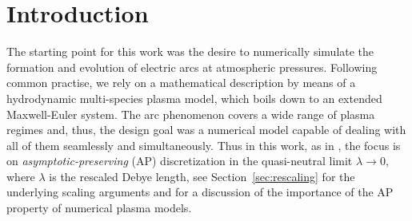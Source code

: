 \documentclass{article}
\newcommand{\mycomment}[1]{\noindent\textcolor{orange}{\underline{\textsf{\textbf{#1}}}}}
\begin{document}



\section{Introduction}

The starting point for this work was the desire to numerically simulate the formation and
evolution of electric arcs at atmospheric pressures. Following common practise, we rely on
a mathematical description by means of a hydrodynamic multi-species plasma model, which
boils down to an extended Maxwell-Euler system. The arc phenomenon covers a wide range of
plasma regimes and, thus, the design goal was a numerical model capable of dealing
with all of them seamlessly and simultaneously. Thus in this work, as in
\cite{degond_2012}, the focus is on \emph{asymptotic-preserving} (AP) discretization in
the quasi-neutral limit $\lambda \rightarrow 0$, where $\lambda$ is the rescaled Debye
length, see Section~\ref{sec:rescaling} for the underlying scaling arguments and
\cite{degond_2012,degond_2017} for a discussion of the importance of the AP property of
numerical plasma models.
\end{document}
